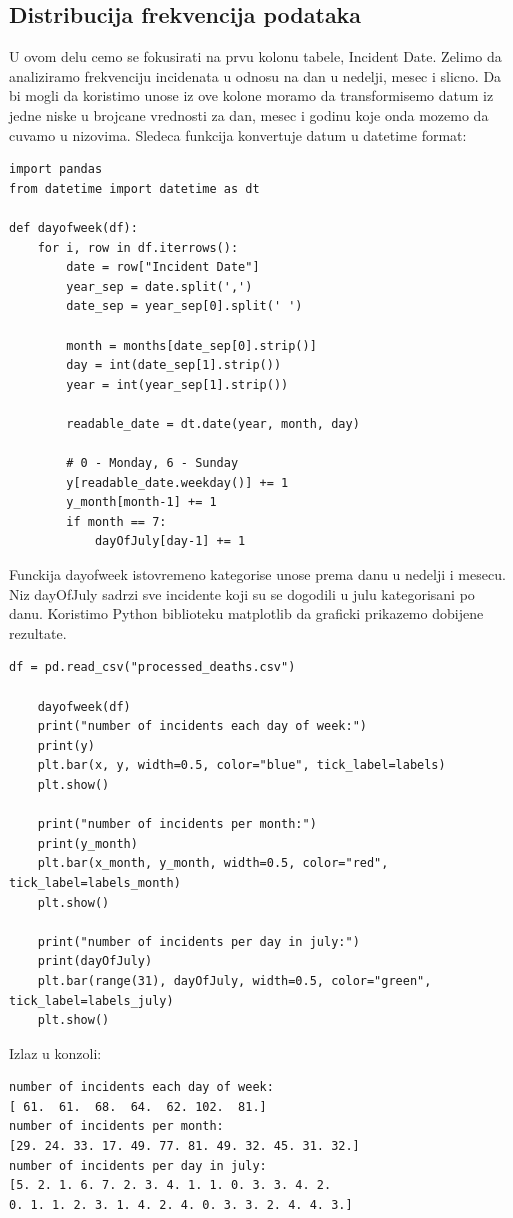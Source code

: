 \documentclass[11pt]{article} %
\begin{document}
\subsection{Distribucija frekvencija podataka}
U ovom delu cemo se fokusirati na prvu kolonu tabele, Incident Date. Zelimo da analiziramo frekvenciju incidenata u odnosu na dan u nedelji, mesec i slicno.
Da bi mogli da koristimo unose iz ove kolone moramo da transformisemo datum iz jedne niske u brojcane vrednosti za dan, mesec i godinu koje onda mozemo
da cuvamo u nizovima. Sledeca funkcija konvertuje datum u datetime format:\newline
\begin{lstlisting}
import pandas
from datetime import datetime as dt

def dayofweek(df):
	for i, row in df.iterrows():
		date = row["Incident Date"]
		year_sep = date.split(',')
		date_sep = year_sep[0].split(' ')

		month = months[date_sep[0].strip()]
		day = int(date_sep[1].strip())
		year = int(year_sep[1].strip())

		readable_date = dt.date(year, month, day)

		# 0 - Monday, 6 - Sunday
		y[readable_date.weekday()] += 1
		y_month[month-1] += 1
		if month == 7:
			dayOfJuly[day-1] += 1
\end{lstlisting}
Funckija dayofweek istovremeno kategorise unose prema danu u nedelji i mesecu. Niz dayOfJuly sadrzi sve incidente koji su se dogodili u julu kategorisani po danu.
Koristimo Python biblioteku matplotlib da graficki prikazemo dobijene rezultate.
\begin{lstlisting}
df = pd.read_csv("processed_deaths.csv")

	dayofweek(df)
	print("number of incidents each day of week:")
	print(y)
	plt.bar(x, y, width=0.5, color="blue", tick_label=labels)
	plt.show()

	print("number of incidents per month:")
	print(y_month)
	plt.bar(x_month, y_month, width=0.5, color="red", tick_label=labels_month)
	plt.show()
	
	print("number of incidents per day in july:")
	print(dayOfJuly)
	plt.bar(range(31), dayOfJuly, width=0.5, color="green", tick_label=labels_july)
	plt.show()
\end{lstlisting}
Izlaz u konzoli:
\begin{lstlisting}
number of incidents each day of week:
[ 61.  61.  68.  64.  62. 102.  81.]
number of incidents per month:
[29. 24. 33. 17. 49. 77. 81. 49. 32. 45. 31. 32.]
number of incidents per day in july:
[5. 2. 1. 6. 7. 2. 3. 4. 1. 1. 0. 3. 3. 4. 2. 
0. 1. 1. 2. 3. 1. 4. 2. 4. 0. 3. 3. 2. 4. 4. 3.]
\end{lstlisting}
\end{document}
